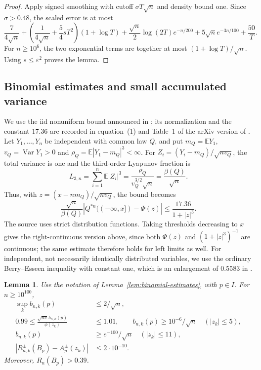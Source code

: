 \documentclass[aop]{imsart}
\theoremstyle{plain}
\newtheorem{lemma}[theorem]{Lemma}
\theoremstyle{definition}
\theoremstyle{definition}
\newcommand{\EE}{\mathbb E}
\DeclareMathOperator{\Var}{Var}
\begin{document}
\begin{proof}
Apply signed smoothing with cutoff $\sigma T\sqrt n$ and density
bound one.  Since $\sigma>0.48$, the scaled error is at most
\[
 \frac7{4\sqrt n}
 +\left(\frac1{4\sqrt n}+\frac54sT^2\right)(1+\log T)
 +\frac{\sqrt n}{2}\log(2T)e^{-n/200}
 +5\sqrt n e^{-3n/100}+\frac{50}{T}.
\]
For $n\ge10^6$, the two exponential terms are together at most
$(1+\log T)/\sqrt n$.  Using $s\le\varepsilon^2$ proves the lemma.
\end{proof}

\subsection{Binomial estimates and small accumulated variance}

We use the iid nonuniform bound announced in
\cite[pp.~124--125]{Shevtsova2013}; its normalization and the
constant $17.36$ are recorded in equation~(1) and Table~1 of the
arXiv version of \cite{Shevtsova2020}.
Let $Y_1,\ldots,Y_n$ be independent with common law $Q$, and put
$m_Q=\EE Y_1$, $v_Q=\Var Y_1>0$ and
$\rho_Q=\EE|Y_1-m_Q|^3<\infty$.
For $Z_i=(Y_i-m_Q)/\sqrt{nv_Q}$, the total variance is one and
the third-order Lyapunov fraction is
\[
 L_{3,n}=\sum_{i=1}^n\EE|Z_i|^3
        =\frac{\rho_Q}{v_Q^{3/2}\sqrt n}
        =\frac{\beta(Q)}{\sqrt n}.
\]
Thus, with $z=(x-nm_Q)/\sqrt{nv_Q}$, the bound becomes
\begin{equation}\label{eq:effective-nonuniform}
 \frac{\sqrt n}{\beta(Q)}
 \left|Q^{*n}((-\infty,x])-\Phi(z)\right|
 \le\frac{17.36}{1+|z|^3}.
\end{equation}
The source uses strict distribution functions.  Taking thresholds
decreasing to $x$ gives the right-continuous version above, since
both $\Phi(z)$ and $(1+|z|^3)^{-1}$ are continuous; the same
estimate therefore holds for left limits as well.
For independent, not necessarily identically distributed variables,
we use the ordinary Berry--Esseen inequality with constant one,
which is an enlargement of $0.5583$ in \cite{Shevtsova2013}.

\begin{lemma}\label{lem:effective-binomial}
Use the notation of Lemma~\ref{lem:binomial-estimates}, with $p\in I$.
For $n\ge10^{100}$,
\begin{align}
 \sup_k b_{n,k}(p)&\le2/\sqrt n,\label{eq:effective-binomial-mass}\\
 0.99\le\frac{\sqrt{nv}\,b_{n,k}(p)}{\phi(z_k)}
 &\le1.01,\qquad
 b_{n,k}(p)\ge10^{-6}/\sqrt n
 \quad (|z_k|\le5),\label{eq:effective-binomial-central}\\
 b_{n,k}(p)&\ge e^{-100}/\sqrt n
 \quad (|z_k|\le11),\label{eq:effective-binomial-wide}\\
 |R^\pm_{n,k}(B_p)-A_p^\pm(z_k)|
 &\le2\cdot10^{-10}.\label{eq:effective-binomial-branches}
\end{align}
Moreover, $R_n(B_p)>0.39$.
\end{lemma}
\end{document}
